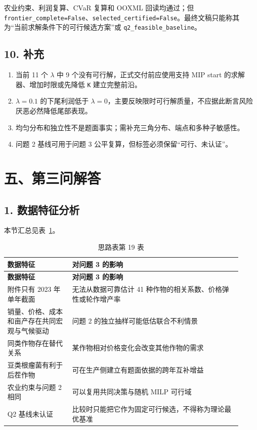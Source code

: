 \documentclass[UTF8,11pt,a4paper]{ctexart}
\begin{document}
农业约束、利润复算、CVaR 复算和 OOXML 回读均通过；但 \texttt{frontier\_complete=False}、\texttt{selected\_certified=False}。最终文稿只能称其为“当前求解条件下的可行候选方案”或 \texttt{q2\_feasible\_baseline}。

\subsection{10. 补充}

\begin{enumerate}
\item 当前 11 个 \(\lambda{}\) 中 9 个没有可行解，正式交付前应使用支持 MIP start 的求解器、增加时限或先降低 \texttt{K} 建立完整前沿。
\item \(\lambda{}=0.1\) 的下尾利润低于 \(\lambda{}=0\)，主要反映限时可行解质量，不应据此断言风险厌恶必然降低尾部表现。
\item 均匀分布和独立性不是题面事实；需补充三角分布、端点和多种子敏感性。
\item 问题 2 基线可用于问题 3 公平复算，但标签必须保留“可行、未认证”。
\end{enumerate}

\section{五、第三问解答}

\subsection{1. 数据特征分析}

\noindent 本节汇总见表~\ref{tab:thought-19}。
\begin{longtable}{@{}>{\raggedright\arraybackslash}p{0.26\linewidth}>{\raggedright\arraybackslash}p{0.68\linewidth}@{}}
\caption{思路表第 19 表}\label{tab:thought-19}\\
\toprule
\textbf{数据特征} & \textbf{对问题 3 的影响} \\
\midrule
\endfirsthead
\toprule
\textbf{数据特征} & \textbf{对问题 3 的影响} \\
\midrule
\endhead
附件只有 2023 年单年截面 & 无法从数据可靠估计 41 种作物的相关系数、价格弹性或轮作增产率 \\
销量、价格、成本和亩产存在共同宏观与气候驱动 & 问题 2 的独立抽样可能低估联合不利情景 \\
同类作物存在替代关系 & 某作物相对价格变化会改变其他作物的需求 \\
豆类根瘤菌有利于后茬作物 & 可在生产侧建立有题面依据的跨年互补增益 \\
农业约束与问题 2 相同 & 可以复用共同决策与随机 MILP 可行域 \\
Q2 基线未认证 & 比较时只能把它作为固定可行候选，不得称为理论最优基准 \\
\bottomrule
\end{longtable}
\end{document}
